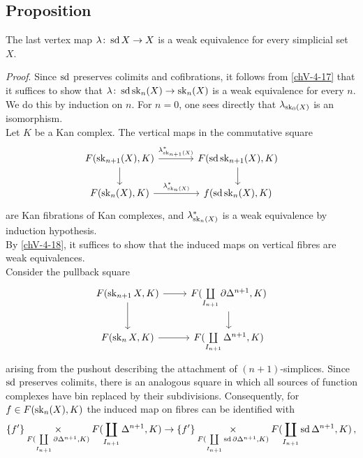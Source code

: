     \subsection{Proposition}\label{chV-4-19}
        The last vertex map $\lambda \colon \operatorname{sd} X \to X$ is a weak equivalence for every simplicial set $X$.
        \smallskip

        \emph{Proof}. Since $\operatorname{sd}$ preserves colimits and cofibrations, it follows from \ref{chV-4-17} that it suffices to show that $\lambda \colon \operatorname{sd} \operatorname{sk}_n(X) \to \operatorname{sk}_n(X)$ is a weak equivalence for every $n$. We do this by induction on $n$. For $n = 0$, one sees directly that $\lambda_{\operatorname{sk}_0(X)}$ is an isomorphism.\\
        Let $K$ be a Kan complex. The vertical maps in the commutative square
        \begin{equation*}
            \begin{tikzcd}[column sep=large]
                F(\sk_{n+1}(X), K) \arrow[d] \arrow[r, "{\lambda^{*}_{\sk_{n+1}(X)}}"] & F(\sd \sk_{n+1}(X), K) \arrow[d] \\
                F(\sk_n(X), K) \arrow[r, "{\lambda^{*}_{\sk_n(X)}}"] & f(\sd \sk_n(X), K)
            \end{tikzcd}
        \end{equation*}
        are Kan fibrations of Kan complexes, and $\lambda^{*}_{\operatorname{sk}_n (X)}$ is a weak equivalence by induction hypothesis.\\
        By \ref{chV-4-18}, it suffices to show that the induced maps on vertical fibres are weak equivalences.\\
        Consider the pullback square
        \begin{equation*}
            \begin{tikzcd}
                F(\sk_{n+1} X, K) \arrow[d] \arrow[r] & F(\coprod\limits_{I_{n+1}} \partial \Delta^{n+1}, K) \arrow[d] \\
                F(\sk_n X, K) \arrow[r] & F(\coprod\limits_{I_{n+1}} \Delta^{n+1}, K)
            \end{tikzcd}
        \end{equation*}
        arising from the pushout describing the attachment of $(n+1)$-simplices. Since $\operatorname{sd}$ preserves colimits, there is an analogous square in which all sources of function complexes have bin replaced by their subdivisions. Consequently, for $f \in F(\operatorname{sk}_n(X), K)$ the induced map on fibres can be identified with
        \begin{equation*}
            \{f'\} \underset{F(\coprod\limits_{I_{n+1}} \partial \Delta^{n+1}, K)}{\times} F(\coprod\limits_{I_{n+1}} \Delta^{n+1}, K) \to \{f'\} \underset{F(\coprod\limits_{I_{n+1}} \operatorname{sd} \partial \Delta^{n+1}, K)}{\times} F(\coprod\limits_{I_{n+1}} \operatorname{sd} \Delta^{n+1}, K) \,, 
        \end{equation*}
